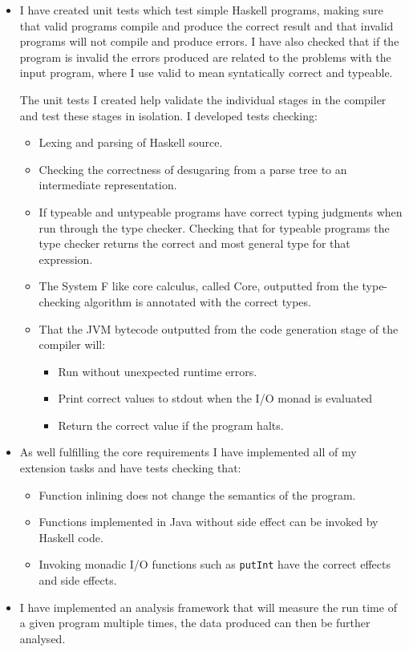 \documentclass[12pt,a4paper,twoside]{article}
\begin{document}
  \begin{itemize}

    \item
      I have created unit tests which test simple Haskell programs, making sure that valid programs compile
      and produce the correct result and that invalid programs will not compile and produce errors.
      I have also checked that if the program is invalid the errors produced are related to the problems with
      the input program, where I use valid to mean syntatically correct and typeable.
      
      The unit tests I created help validate the individual stages in the compiler and test these
      stages in isolation. 
      I developed tests checking:
      \begin{itemize}
        \item Lexing and parsing of Haskell source.
        \item Checking the correctness of desugaring from a parse tree to an intermediate representation.
        \item If typeable and untypeable programs have correct typing judgments when run through 
          the type checker. Checking that for typeable programs the type checker returns the correct
          and most general type for that expression.
        \item The System F like core calculus, called Core, 
          outputted from the type-checking algorithm is annotated with the correct types.
        \item That the JVM bytecode outputted from the code generation stage of the compiler  
          will:
         \begin{itemize} 
            \item Run without unexpected runtime errors.
            \item Print correct values to stdout when the I/O monad is evaluated 
            \item Return the correct value if the program halts.
        \end{itemize}
      \end{itemize}

    \item As well fulfilling the core requirements I have implemented all of my extension tasks and have tests checking 
          that:
      \begin{itemize}
        \item Function inlining does not change the semantics of the program.
        \item Functions implemented in Java without side effect can be invoked by 
              Haskell code.
        \item Invoking monadic I/O functions such as \texttt{putInt} have the correct effects and 
              side effects.
      \end{itemize}

    \item I have implemented an analysis framework that will measure the run time of a given program
          multiple times, the data produced can then be further analysed.

  \end{itemize}
\end{document}
